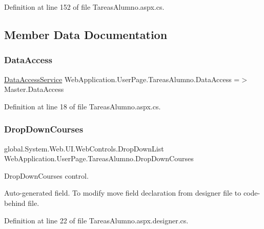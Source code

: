 Definition at line 152 of file Tareas\+Alumno.\+aspx.\+cs.



\subsection{Member Data Documentation}
\mbox{\label{classWebApplication_1_1UserPage_1_1TareasAlumno_a63b4d6c345c2df409f3119583bf39039}} 
\subsubsection{\texorpdfstring{DataAccess}{DataAccess}}
{\footnotesize\ttfamily \mbox{\hyperlink{classDataBaseAccess_1_1DataAccessService}{Data\+Access\+Service}} Web\+Application.\+User\+Page.\+Tareas\+Alumno.\+Data\+Access =$>$ Master.\+Data\+Access}



Definition at line 18 of file Tareas\+Alumno.\+aspx.\+cs.

\mbox{\label{classWebApplication_1_1UserPage_1_1TareasAlumno_a7fbd883512b50dbc46ea6e9cfc081c75}} 
\subsubsection{\texorpdfstring{DropDownCourses}{DropDownCourses}}
{\footnotesize\ttfamily global.\+System.\+Web.\+U\+I.\+Web\+Controls.\+Drop\+Down\+List Web\+Application.\+User\+Page.\+Tareas\+Alumno.\+Drop\+Down\+Courses\hspace{0.3cm}{\ttfamily [protected]}}



Drop\+Down\+Courses control. 

Auto-\/generated field. To modify move field declaration from designer file to code-\/behind file. 

Definition at line 22 of file Tareas\+Alumno.\+aspx.\+designer.\+cs.

